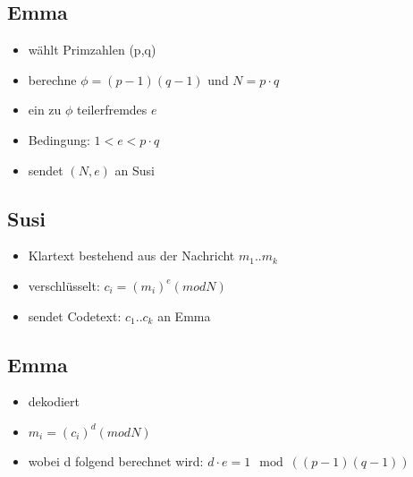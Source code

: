 
\subsection{Emma}
\label{sec:emma}

\begin{itemize}
\item wählt Primzahlen (p,q)
\item berechne $\phi = (p-1)(q-1)$ und $N = p \cdot q$
\item ein zu $\phi$ teilerfremdes $e$
\item Bedingung: $1 < e < p\cdot q$
\item sendet $(N, e)$ an Susi
\end{itemize}

\subsection{Susi}
\begin{itemize}
\item Klartext bestehend aus der Nachricht $m_{1}..m_{k}$
\item verschlüsselt: $c_{i} = (m_{i})^{e} (mod N)$
\item sendet Codetext:  $c_{1}..c_{k}$ an Emma
\end{itemize}

\subsection{Emma}
\begin{itemize}
\item dekodiert
\item $m_{i} = (c_{i})^{d} (mod N)$
\item wobei d folgend berechnet wird: $d \cdot e = 1 \mod ((p-1)(q-1))$
\end{itemize}